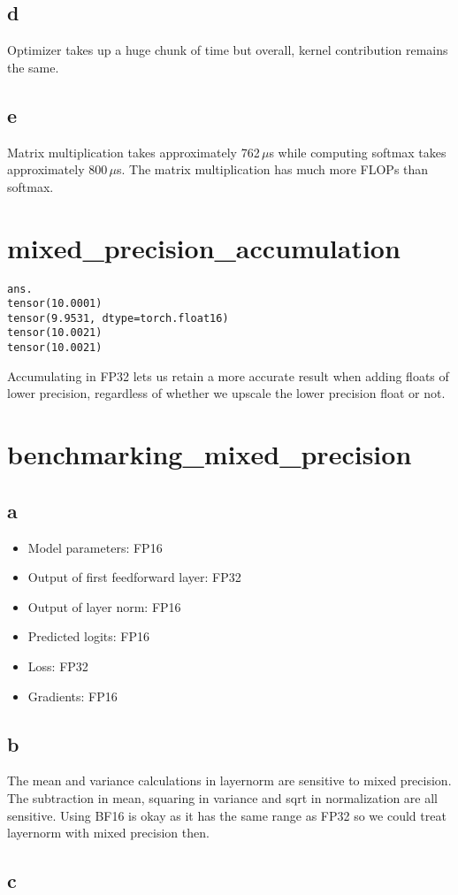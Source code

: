 \documentclass{article}
\begin{document}
\subsection*{d}
Optimizer takes up a huge chunk of time but overall, kernel contribution remains the same.

\subsection*{e}
Matrix multiplication takes approximately 762\,$\mu$s while computing softmax takes approximately 800\,$\mu$s. The matrix multiplication has much more FLOPs than softmax.

\newpage
\section{mixed\_precision\_accumulation}

\begin{lstlisting}
ans. 
tensor(10.0001)
tensor(9.9531, dtype=torch.float16)
tensor(10.0021)
tensor(10.0021)
\end{lstlisting}

Accumulating in FP32 lets us retain a more accurate result when adding floats of lower precision, regardless of whether we upscale the lower precision float or not.

\newpage
\section{benchmarking\_mixed\_precision}

\subsection*{a}
\begin{itemize}
  \item Model parameters: FP16
  \item Output of first feedforward layer: FP32
  \item Output of layer norm: FP16
  \item Predicted logits: FP16
  \item Loss: FP32
  \item Gradients: FP16
\end{itemize}

\subsection*{b}
The mean and variance calculations in layernorm are sensitive to mixed precision.
The subtraction in mean, squaring in variance and sqrt in normalization are all sensitive.
Using BF16 is okay as it has the same range as FP32 so we could treat layernorm with mixed precision then.


\subsection*{c}
\end{document}
